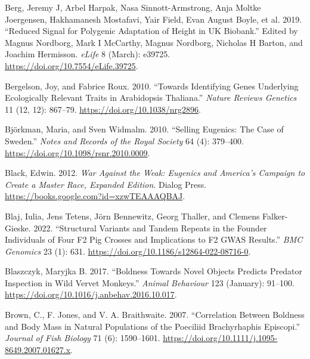 \documentclass[
]{book}
\newlength{\cslhangindent}
\newlength{\cslentryspacingunit} %
\newenvironment{CSLReferences}[2] %
 {%
  \setlength{\parindent}{0pt}
  \ifodd #1
  \let\oldpar\par
  \def\par{\hangindent=\cslhangindent\oldpar}
  \fi
  \setlength{\parskip}{#2\cslentryspacingunit}
 }%
 {}
\begin{document}
\begin{CSLReferences}{1}{0}
\leavevmode{}%
Berg, Jeremy J, Arbel Harpak, Nasa Sinnott-Armstrong, Anja Moltke Joergensen, Hakhamanesh Mostafavi, Yair Field, Evan August Boyle, et al. 2019. {``Reduced Signal for Polygenic Adaptation of Height in {UK Biobank}.''} Edited by Magnus Nordborg, Mark I McCarthy, Magnus Nordborg, Nicholas H Barton, and Joachim Hermisson. \emph{eLife} 8 (March): e39725. \url{https://doi.org/10.7554/eLife.39725}.

\leavevmode{}%
Bergelson, Joy, and Fabrice Roux. 2010. {``Towards Identifying Genes Underlying Ecologically Relevant Traits in {Arabidopsis} Thaliana.''} \emph{Nature Reviews Genetics} 11 (12, 12): 867--79. \url{https://doi.org/10.1038/nrg2896}.

\leavevmode{}%
Björkman, Maria, and Sven Widmalm. 2010. {``Selling Eugenics: The Case of {Sweden}.''} \emph{Notes and Records of the Royal Society} 64 (4): 379--400. \url{https://doi.org/10.1098/rsnr.2010.0009}.

\leavevmode{}%
Black, Edwin. 2012. \emph{War {Against} the {Weak}: {Eugenics} and {America}'s {Campaign} to {Create} a {Master Race}, {Expanded Edition}}. {Dialog Press}. \url{https://books.google.com?id=xzwTEAAAQBAJ}.

\leavevmode{}%
Blaj, Iulia, Jens Tetens, Jörn Bennewitz, Georg Thaller, and Clemens Falker-Gieske. 2022. {``Structural Variants and Tandem Repeats in the Founder Individuals of Four {F2} Pig Crosses and Implications to {F2 GWAS} Results.''} \emph{BMC Genomics} 23 (1): 631. \url{https://doi.org/10.1186/s12864-022-08716-0}.

\leavevmode{}%
Blaszczyk, Maryjka B. 2017. {``Boldness Towards Novel Objects Predicts Predator Inspection in Wild Vervet Monkeys.''} \emph{Animal Behaviour} 123 (January): 91--100. \url{https://doi.org/10.1016/j.anbehav.2016.10.017}.

\leavevmode{}%
Brown, C., F. Jones, and V. A. Braithwaite. 2007. {``Correlation Between Boldness and Body Mass in Natural Populations of the Poeciliid {Brachyrhaphis} Episcopi.''} \emph{Journal of Fish Biology} 71 (6): 1590--1601. \url{https://doi.org/10.1111/j.1095-8649.2007.01627.x}.


\end{CSLReferences}
\end{document}
